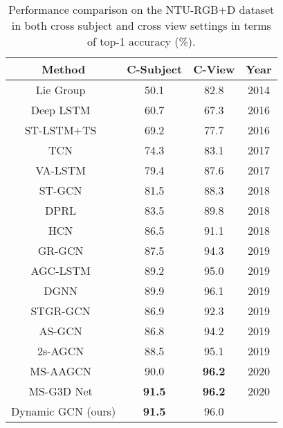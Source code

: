 \documentclass[sigconf]{acmart}
\begin{document}
\begin{table}[t]
  \caption{Performance comparison on the NTU-RGB+D dataset in both cross subject and cross view settings in terms of top-1 accuracy (\%).}
  \label{table4}
    \begin{tabular}{c|c|c|c}
    \toprule
    Method  & C-Subject & C-View & Year \\
    \midrule
    Lie Group~\cite{vemulapalli2014human}  & 50.1  & 82.8 & 2014  \\
    Deep LSTM~\cite{shahroudy} & 60.7  & 67.3& 2016 \\
    ST-LSTM+TS~\cite{liu2016spatio}  & 69.2  & 77.7& 2016 \\
    TCN~\cite{kim2017interpretable} & 74.3  & 83.1&2017  \\
    VA-LSTM~\cite{zhang2017view}  & 79.4  & 87.6& 2017 \\
    ST-GCN~\cite{yanspatial} & 81.5  & 88.3& 2018 \\
    DPRL~\cite{tang2018deep} & 83.5  & 89.8 &2018 \\
    HCN~\cite{lili} & 86.5  & 91.1&2018  \\
    GR-GCN~\cite{gao2019} & 87.5  & 94.3& 2019 \\
    AGC-LSTM~\cite{si2019attention} & 89.2  & 95.0& 2019 \\
    DGNN~\cite{shi2019skeleton}  & 89.9  & 96.1 &2019 \\
    STGR-GCN~\cite{li2019spatio} & 86.9  & 92.3 &2019 \\
    AS-GCN~\cite{li2019actional} & 86.8  & 94.2 &2019 \\
    2s-AGCN~\cite{shi2019two} & 88.5  & 95.1 &2019 \\
    MS-AAGCN~\cite{shi2019} & 90.0  & \textbf{96.2} & 2020\\
    MS-G3D Net~\cite{liu2020} & \textbf{91.5}  & \textbf{96.2}  &2020\\
    \midrule
    Dynamic GCN (ours) & \textbf{91.5 } & 96.0 &\\
    \bottomrule
    \end{tabular}\end{table}
\end{document}

